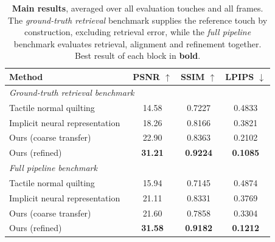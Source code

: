 \begin{table}[t]
  \centering
  \small
  \caption{\textbf{Main results}, averaged over all evaluation touches and all frames. The
    \emph{ground-truth retrieval} benchmark supplies the reference touch by construction, excluding
    retrieval error, while the \emph{full pipeline} benchmark evaluates retrieval, alignment and
    refinement together. Best result of each block in \textbf{bold}.}
  \label{tab:main}
  \begin{tabular}{l c c c}
    \hline
    Method & PSNR $\uparrow$ & SSIM $\uparrow$ & LPIPS $\downarrow$ \\
    \hline
    \multicolumn{4}{l}{\emph{Ground-truth retrieval benchmark}} \\
    Tactile normal quilting~\cite{tactiledreamfusion} & 14.58 & 0.7227 & 0.4833 \\
    Implicit neural representation~\cite{objectfolder} & 18.26 & 0.8166 & 0.3821 \\
    Ours (coarse transfer)                        & 22.90 & 0.8363 & 0.2102 \\
    Ours (refined)                                & \textbf{31.21} & \textbf{0.9224} & \textbf{0.1085} \\
    \hline
    \multicolumn{4}{l}{\emph{Full pipeline benchmark}} \\
    Tactile normal quilting~\cite{tactiledreamfusion} & 15.94 & 0.7145 & 0.4874 \\
    Implicit neural representation~\cite{objectfolder} & 21.11 & 0.8331 & 0.3769 \\
    Ours (coarse transfer)                        & 21.60 & 0.7858 & 0.3304 \\
    Ours (refined)                                & \textbf{31.58} & \textbf{0.9182} & \textbf{0.1212} \\
    \hline
  \end{tabular}
\end{table}
